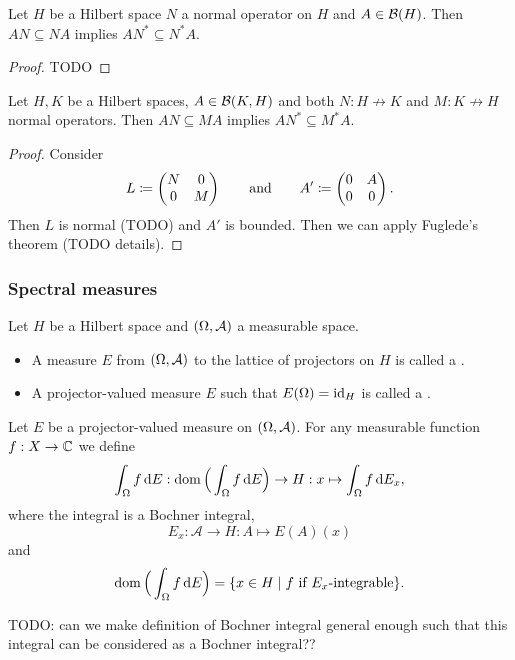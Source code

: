 \begin{theorem}
Let $H$ be a Hilbert space $N$ a normal operator on $H$ and $A\in\operatorname{\mathcal{B}}(H)$. Then $AN\subseteq NA$ implies $AN^* \subseteq N^*A$.
\end{theorem}
\begin{proof}
TODO
\end{proof}
\begin{corollary}
Let $H, K$ be a Hilbert spaces, $A\in\operatorname{\mathcal{B}}(K, H)$ and both $N: H\not\to K$ and $M: K\not\to H$ normal operators. Then $AN\subseteq MA$ implies $AN^* \subseteq M^*A$.
\end{corollary}
\begin{proof}
Consider
\[ L \coloneqq \begin{pmatrix}
N & 0 \\ 0 & M
\end{pmatrix} \qquad\text{and}\qquad A' \coloneqq \begin{pmatrix}
0 & A \\ 0 & 0
\end{pmatrix}. \]
Then $L$ is normal (TODO) and $A'$ is bounded. Then we can apply Fuglede's theorem (TODO details).
\end{proof}

\subsubsection{Spectral measures}
\begin{definition}
Let $H$ be a Hilbert space and $\sSet{\Omega,\mathcal{A}}$ a measurable space.
\begin{itemize}
\item A measure $E$ from $\sSet{\Omega,\mathcal{A}}$ to the lattice of projectors on $H$ is called a .
\item A projector-valued measure $E$ such that $E(\Omega) = \operatorname{id}_H$ is called a .
\end{itemize}
Let $E$ be a projector-valued measure on $\sSet{\Omega,\mathcal{A}}$. For any measurable function $f: X\to \mathbb{C}$ we define
\[ \int_\Omega f\operatorname{d \!}{E}: \operatorname{dom}\Big(\int_\Omega f\operatorname{d \!}{E}\Big) \to H: x\mapsto \int_\Omega f\operatorname{d \!}{E_x}, \]
where the integral is a Bochner integral,
\[ E_x: \mathcal{A}\to H: A\mapsto E(A)(x) \]
and
\[ \dom\Big(\int_\Omega f\diff{E}\Big) = \setbuilder{x\in H}{\text{$f$ if $E_x$-integrable}}. \]
\end{definition}
TODO: can we make definition of Bochner integral general enough such that this integral can be  considered as a Bochner integral??

